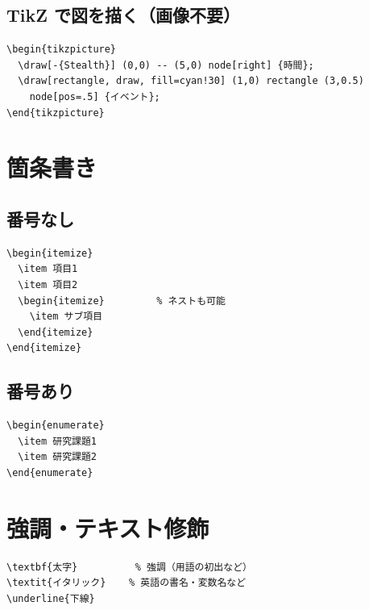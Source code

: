 \documentclass[dvipdfmx, twocolumn, 10pt]{bxjsarticle}
\begin{document}
\subsection{TikZ で図を描く（画像不要）}

\begin{lstlisting}
\begin{tikzpicture}
  \draw[-{Stealth}] (0,0) -- (5,0) node[right] {時間};
  \draw[rectangle, draw, fill=cyan!30] (1,0) rectangle (3,0.5)
    node[pos=.5] {イベント};
\end{tikzpicture}
\end{lstlisting}

\section{箇条書き}

\subsection{番号なし}

\begin{lstlisting}
\begin{itemize}
  \item 項目1
  \item 項目2
  \begin{itemize}         % ネストも可能
    \item サブ項目
  \end{itemize}
\end{itemize}
\end{lstlisting}

\subsection{番号あり}

\begin{lstlisting}
\begin{enumerate}
  \item 研究課題1
  \item 研究課題2
\end{enumerate}
\end{lstlisting}

\section{強調・テキスト修飾}

\begin{lstlisting}
\textbf{太字}          % 強調（用語の初出など）
\textit{イタリック}    % 英語の書名・変数名など
\underline{下線}
\end{lstlisting}
\end{document}
